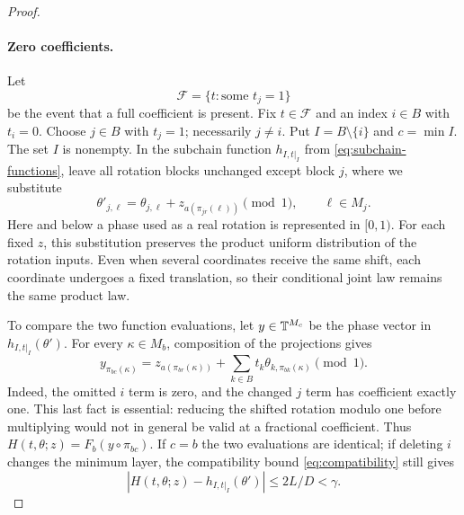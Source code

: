 \begin{proof}
\paragraph{Zero coefficients.}
Let
\[
 \mathcal F=\{t:\text{some }t_j=1\}
\]
be the event that a full coefficient is present.  Fix $t\in\mathcal F$
and an index $i\in B$ with $t_i=0$.  Choose $j\in B$ with $t_j=1$;
necessarily $j\ne i$.  Put $I=B\setminus\{i\}$ and $c=\min I$.
The set $I$ is nonempty.  In the subchain function
$h_{I,t|_I}$ from \eqref{eq:subchain-functions}, leave all rotation
blocks unchanged except block $j$, where we substitute
\begin{equation}\label{coeff:shift}
 \theta'_{j,\ell}
 =\theta_{j,\ell}+z_{a(\pi_{jr}(\ell))}\pmod 1,
 \qquad \ell\in M_j.
\end{equation}
Here and below a phase used as a real rotation is represented in
$[0,1)$.  For each fixed $z$, this substitution preserves the product
uniform distribution of the rotation inputs.  Even when several
coordinates receive the same shift, each coordinate undergoes a fixed
translation, so their conditional joint law remains the same product
law.

To compare the two function evaluations, let $y\in\mathbb T^{M_c}$ be the
phase vector in $h_{I,t|_I}(\theta')$.  For every $\kappa\in M_b$,
composition of the projections gives
\begin{equation}\label{coeff:pullback-identity}
 y_{\pi_{bc}(\kappa)}
 =z_{a(\pi_{br}(\kappa))}
   +\sum_{k\in B}t_k\theta_{k,\pi_{bk}(\kappa)}
   \pmod 1.
\end{equation}
Indeed, the omitted $i$ term is zero, and the changed $j$ term has
coefficient exactly one.  This last fact is essential: reducing the
shifted rotation modulo one before multiplying would not in general be
valid at a fractional coefficient.  Thus
$H(t,\theta;z)=F_b(y\circ\pi_{bc})$.  If $c=b$ the two evaluations
are identical; if deleting $i$ changes the minimum layer, the
compatibility bound \eqref{eq:compatibility} still gives
\begin{equation}\label{coeff:deletion-error}
 |H(t,\theta;z)-h_{I,t|_I}(\theta')|
 \le 2L/D<\gamma.
\end{equation}


\end{proof}
